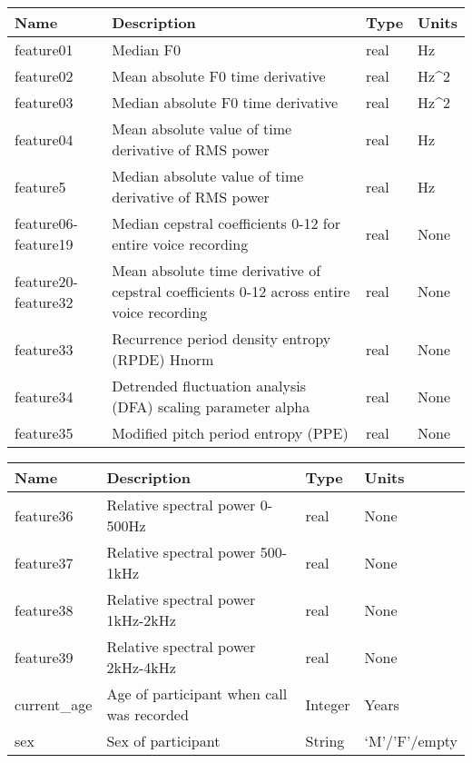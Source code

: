 \begin{tabularx}{1\textwidth} { 
		| >{\raggedright\arraybackslash}X 
		| >{\raggedright\arraybackslash}X 
		| >{\raggedright\arraybackslash}X 
		| >{\raggedright\arraybackslash}X |}
	\hline
	\textbf{Name} & \textbf{Description} & \textbf{Type} & \textbf{Units} \\
	\hline
	feature01  & Median F0  & real & Hz  \\
	\hline
	feature02  & Mean absolute F0 time derivative  & real & Hz^2 \\
	\hline
	feature03  & Median absolute F0 time derivative  & real & Hz^2  \\
	\hline
	feature04  & Mean absolute value of time derivative of RMS power  & real & Hz  \\
	\hline
	feature5  &Median absolute value of time derivative of RMS power  & real & Hz  \\
	\hline
	feature06-feature19  & Median cepstral coefficients 0-12 for entire voice recording  & real & None  \\
	\hline
	feature20-feature32  & Mean absolute time derivative of cepstral coefficients 0-12 across entire voice recording  & real & None  \\
	\hline
	feature33  & Recurrence period density entropy (RPDE) Hnorm  & real & None  \\
	\hline
	feature34  & Detrended fluctuation analysis (DFA) scaling parameter alpha  & real & None  \\
	\hline
	feature35  & Modified pitch period entropy (PPE)  & real & None  \\
	\hline
\end{tabularx}

\begin{tabularx}{1\textwidth} { 
		| >{\raggedright\arraybackslash}X 
		| >{\raggedright\arraybackslash}X 
		| >{\raggedright\arraybackslash}X 
		| >{\raggedright\arraybackslash}X |}
	\hline
	\textbf{Name} & \textbf{Description} & \textbf{Type} & \textbf{Units} \\
	\hline
	\hline
	feature36  & Relative spectral power 0-500Hz  & real & None  \\
	\hline
	feature37  & Relative spectral power 500-1kHz  & real & None  \\
	\hline
	feature38  & Relative spectral power 1kHz-2kHz  & real & None  \\
	\hline
	feature39  & Relative spectral power 2kHz-4kHz  & real & None  \\
	\hline
	current\_age  & Age of participant when call was recorded  & Integer & Years  \\
	\hline
	sex  & Sex of participant  & String & ‘M’/’F’/empty  \\
	\hline
\end{tabularx}


